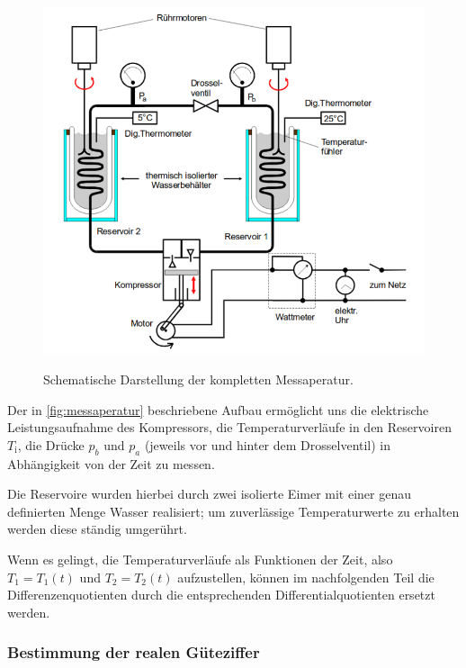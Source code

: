 \begin{figure}
	\centering
	\includegraphics{content/messaperatur.pdf}
	\caption{Schematische Darstellung der kompletten Messaperatur.}
	\cite{anleitung}
	\label{fig:messaperatur}
\end{figure}

Der in \autoref{fig:messaperatur} beschriebene Aufbau erm\"oglicht uns 
die elektrische Leistungsaufnahme des Kompressors,
die Temperaturverl\"aufe in den Reservoiren $T_\text{i}$, 
die Dr\"ucke $p_b$ und $p_a$ (jeweils vor und hinter dem Drosselventil)
in Abh\"angigkeit von der Zeit zu messen.

Die Reservoire wurden hierbei durch zwei isolierte Eimer mit einer genau
definierten Menge Wasser realisiert; um zuverl\"assige Temperaturwerte zu erhalten
werden diese st\"andig umger\"uhrt.

Wenn es gelingt, die Temperaturverl\"aufe als Funktionen der Zeit, also $T_1 = T_1(t)$ und
$T_2 = T_2(t)$ aufzustellen, k\"onnen im nachfolgenden Teil die Differenzenquotienten durch
die entsprechenden Differentialquotienten ersetzt werden.

\subsubsection{Bestimmung der realen Güteziffer}

